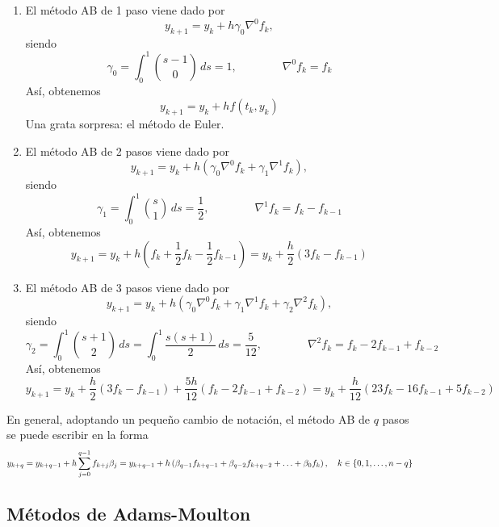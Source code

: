 \documentclass[11pt]{report}
\theoremstyle{mytheorem}
\theoremstyle{mydefinition}
\theoremstyle{myexample}
\newcommand{\comment}[1]{}
\begin{document}
\begin{enumerate}
    \item El método AB de 1 paso viene dado por
    \[y_{k+1} = y_k+h\gamma_0\nabla^0f_k,\]
    siendo
    \[\gamma_0 = \int_0^1 \binom{s-1}{0} \, ds = 1, \qquad \qquad \nabla^0f_k = f_k\]
    Así, obtenemos
    \[y_{k+1}=y_k+hf(t_k,y_k)\]
    Una grata sorpresa: el método de Euler.
    \item El método AB de 2 pasos viene dado por
    \[y_{k+1} = y_k+h\left(\gamma_0\nabla^0f_k+\gamma_1\nabla^1f_k\right),\]
    siendo
    \[\gamma_1 = \int_0^1 \binom{s}{1} \, ds = \frac{1}{2}, \qquad \qquad \nabla^1f_k = f_k-f_{k-1}\]
    Así, obtenemos
    \[y_{k+1}=y_k+h\left(f_k+\frac{1}{2}f_k-\frac{1}{2}f_{k-1}\right) = y_k+\frac{h}{2}\left(3f_k-f_{k-1}\right)\]
    \item El método AB de 3 pasos viene dado por
    \[y_{k+1} = y_k+h\left(\gamma_0\nabla^0f_k+\gamma_1\nabla^1f_k+\gamma_2\nabla^2f_k\right),\]
    siendo
    \[\gamma_2 = \int_0^1 \binom{s+1}{2} \, ds = \int_0^1 \frac{s(s+1)}{2} \, ds= \frac{5}{12}, \qquad \qquad \nabla^2f_k = f_k-2f_{k-1}+f_{k-2}\]
    Así, obtenemos
    \[y_{k+1}= y_k+\frac{h}{2}\left(3f_k-f_{k-1}\right)+\frac{5h}{12}\left(f_k-2f_{k-1}+f_{k-2}\right) = y_k+\frac{h}{12}\left(23f_k-16f_{k-1}+5f_{k-2}\right)\]
\end{enumerate}
\comment{
Obsérvese que las aproximaciones del método de Adams-Bashforth de $q$ pasos se hallan de forma razonadamente sencilla partir de las del método de $q-1$ pasos. Para enfatizar esto, los métodos de 1, 2 y 3 pasos también suelen escribirse como
\[
\begin{alignedat}{2}
y_{k+1} &= y_k+hf_k, \quad & k &\in \{0,1,\mathellipsis,n-1\} \\
y_{k+2} &= y_{k+1}+\frac{h}{2}\left(3f_{k+1}-f_{k}\right), \quad & k &\in \{0,1,\mathellipsis,n-2\} \\
y_{k+3} &= y_{k+2}+\frac{h}{12}\left(23f_{k+2}-16f_{k+1}+5f_{k}\right), \quad & k &\in \{0,1,\mathellipsis,n-3\}
\end{alignedat}
\]}
En general, adoptando un pequeño cambio de notación, el método AB de $q$ pasos se puede escribir en la forma
\[y_{k+q} = y_{k+q-1}+h\sum_{j=0}^{q-1}f_{k+j}\beta_j = y_{k+q-1}+h\left(\beta_{q-1}f_{k+q-1}+\beta_{q-2}f_{k+q-2}+\mathellipsis+\beta_0f_k\right), \quad k \in \{0,1,\mathellipsis,n-q\}\]

\subsection{Métodos de Adams-Moulton}
\end{document}
